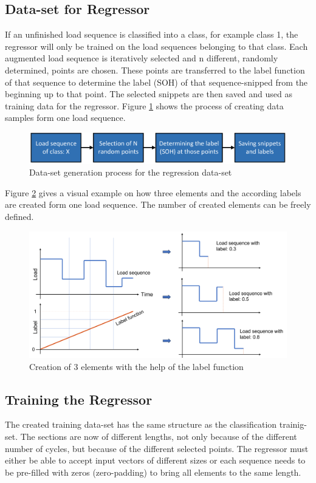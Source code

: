 \subsection{Data-set for Regressor}\label{PrRe}
If an unfinished load sequence is classified into a class, for example class 1, the regressor will only be trained on the load sequences belonging to that class. Each augmented load sequence is iteratively selected and n different, randomly determined, points are chosen. These points are transferred to the label function of that sequence to determine the label (SOH) of that sequence-snipped from the beginning up to that point. The selected snippets are then saved and used as training data for the regressor.   
Figure \ref{fig:dataregressor} shows the process of creating data samples form one load sequence.

\begin{figure}[H]
	\centering
	\includegraphics[width=0.85\linewidth]{IMGs/dataregressor.png}
	\caption{Data-set generation process for the regression data-set}
	\label{fig:dataregressor}
\end{figure}

Figure \ref{fig:4elems} gives a visual example on how three elements and the according labels are created form one load sequence. The number of created elements can be freely defined.

\begin{figure}[H]
	\centering
	\includegraphics[width=0.95\linewidth]{IMGs/4elems.png}
	\caption{Creation of 3 elements with the help of the label function}
	\label{fig:4elems}
\end{figure}
\subsection{Training the Regressor}
The created training data-set has the same structure as the classification trainig-set. The sections are now of different lengths, not only because of the different number of cycles, but because of the different selected points. The regressor must either be able to accept input vectors of different sizes or each sequence needs to be pre-filled with zeros (zero-padding) to bring all elements to the same length.
